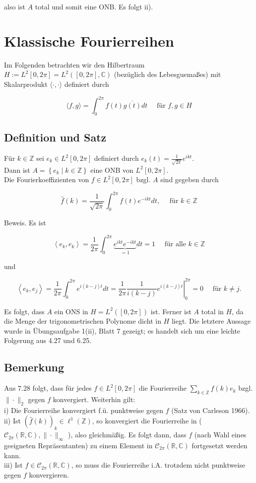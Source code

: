 \documentclass[10pt, letterpaper]{article}
\begin{document}
also ist $A$ total und somit eine ONB. Es folgt ii).

\section*{Klassische Fourierreihen}
Im Folgenden betrachten wir den Hilbertraum $H:=L^{2}[0,2 \pi]=L^{2}([0,2 \pi], \mathbb{C})$ (bezüglich des Lebesguemaßes) mit Skalarprodukt $\langle\cdot, \cdot\rangle$ definiert durch

$$
\langle f, g\rangle=\int_{0}^{2 \pi} f(t) \overline{g(t)} d t \quad \text { für } f, g \in H
$$

\subsection*{Definition und Satz}
Für $k \in \mathbb{Z}$ sei $e_{k} \in L^{2}[0,2 \pi]$ definiert durch $e_{k}(t)=\frac{1}{\sqrt{2 \pi}} e^{i k t}$.\\
Dann ist $A=\left\{e_{k} \mid k \in \mathbb{Z}\right\}$ eine ONB von $L^{2}[0,2 \pi]$.\\
Die Fourierkoeffizienten von $f \in L^{2}[0,2 \pi]$ bzgl. $A$ sind gegeben durch

$$
\hat{f}(k)=\frac{1}{\sqrt{2 \pi}} \int_{0}^{2 \pi} f(t) e^{-i k t} d t, \quad \text { für } k \in \mathbb{Z}
$$

Beweis. Es ist

$$
\left\langle e_{k}, e_{k}\right\rangle=\frac{1}{2 \pi} \int_{0}^{2 \pi} \underbrace{e^{i k t} e^{-i k t}}_{=1} d t=1 \quad \text { für alle } k \in \mathbb{Z}
$$

und

$$
\left\langle e_{k}, e_{j}\right\rangle=\frac{1}{2 \pi} \int_{0}^{2 \pi} e^{i(k-j) t} d t=\left.\frac{1}{2 \pi} \frac{1}{i(k-j)} e^{i(k-j) t}\right|_{0} ^{2 \pi}=0 \quad \text { für } k \neq j .
$$

Es folgt, dass $A$ ein ONS in $H=L^{2}([0,2 \pi])$ ist. Ferner ist $A$ total in $H$, da die Menge der trigonometrischen Polynome dicht in $H$ liegt. Die letztere Aussage wurde in Übungsaufgabe 1(ii), Blatt 7 gezeigt; es handelt sich um eine leichte Folgerung aus 4.27 und 6.25.

\subsection*{Bemerkung}
Aus 7.28 folgt, dass für jedes $f \in L^{2}[0,2 \pi]$ die Fourierreihe $\sum_{k \in \mathbb{Z}} \hat{f}(k) e_{k}$ bzgl. $\|\cdot\|_{2}$ gegen $f$ konvergiert. Weiterhin gilt:\\
i) Die Fourierreihe konvergiert f.ü. punktweise gegen $f$ (Satz von Carleson 1966).\\
ii) Ist $(\hat{f}(k))_{k} \in \ell^{1}(\mathbb{Z})$, so konvergiert die Fourierreihe in ( $\mathcal{C}_{2 \pi}(\mathbb{R}, \mathbb{C}),\|\cdot\|_{\infty}$ ), also gleichmäßig. Es folgt dann, dass $f$ (nach Wahl eines geeigneten Repräsentanten) zu einem Element in $\mathcal{C}_{2 \pi}(\mathbb{R}, \mathbb{C})$ fortgesetzt werden kann.\\
iii) Ist $f \in \mathcal{C}_{2 \pi}(\mathbb{R}, \mathbb{C})$, so muss die Fourierreihe i.A. trotzdem nicht punktweise gegen $f$ konvergieren.
\end{document}

